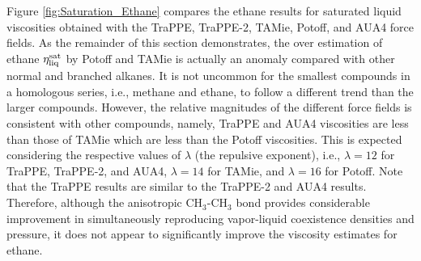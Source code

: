 \documentclass[preprint,review,12pt]{elsarticle}
\begin{document}
	Figure \ref{fig:Saturation_Ethane} compares the ethane results for saturated liquid viscosities obtained with the TraPPE, TraPPE-2, TAMie, Potoff, and AUA4 force fields. As the remainder of this section demonstrates, the over estimation of ethane $\eta_{\rm liq}^{\rm sat}$ by Potoff and TAMie is actually an anomaly compared with other normal and branched alkanes. It is not uncommon for the smallest compounds in a homologous series, i.e., methane and ethane, to follow a different trend than the larger compounds. However, the relative magnitudes of the different force fields is consistent with other compounds, namely, TraPPE and AUA4 viscosities are less than those of TAMie which are less than the Potoff viscosities. This is expected considering the respective values of $\lambda$ (the repulsive exponent), i.e., $\lambda = 12$ for TraPPE, TraPPE-2, and AUA4, $\lambda = 14$ for TAMie, and $\lambda = 16$ for Potoff. Note that the TraPPE results are similar to the TraPPE-2 and AUA4 results. Therefore, although the anisotropic CH$_3$-CH$_3$ bond provides considerable improvement in simultaneously reproducing vapor-liquid coexistence densities and pressure, it does not appear to significantly improve the viscosity estimates for ethane.

	
	
\end{document}
